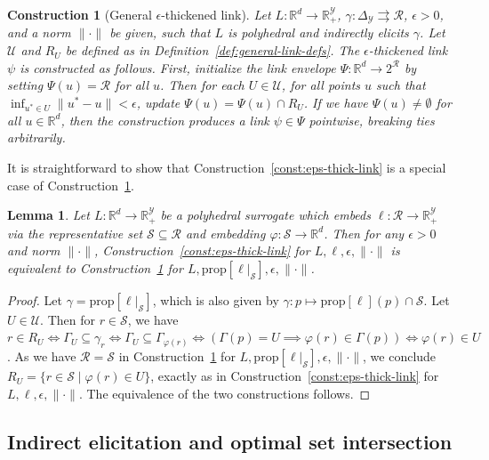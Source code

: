 \documentclass[11pt]{article}
\newcommand{\reals}{\mathbb{R}}
\newcommand{\prop}[1]{\mathrm{prop}[#1]}
\newcommand{\simplex}{\Delta_\Y}
\newcommand{\R}{\mathcal{R}}
\newcommand{\Sc}{\mathcal{S}}
\newcommand{\U}{\mathcal{U}}
\newcommand{\Y}{\mathcal{Y}}
\newcommand{\toto}{\rightrightarrows}
\newtheorem{lemma}{Lemma}
\newtheorem{construction}{Construction}
\begin{document}
\begin{construction}[General $\epsilon$-thickened link] \label{const:general-eps-thick-link}
  Let $L:\reals^d\to\reals^\Y_+$, $\gamma:\simplex\toto\R$, $\epsilon > 0$, and a norm $\|\cdot\|$ be given, such that $L$ is polyhedral and indirectly elicits $\gamma$.
  Let $\U$ and $R_U$ be defined as in Definition~\ref{def:general-link-defs}.
  The \emph{$\epsilon$-thickened link} $\psi$ is constructed as follows.
  First, initialize the \emph{link envelope} $\Psi: \reals^d \to 2^{\R}$ by setting $\Psi(u) = \R$ for all $u$.
  Then for each $U \in \U$, for all points $u$ such that $\inf_{u^* \in U} \|u^*-u\| < \epsilon$, update $\Psi(u) = \Psi(u) \cap R_U$.
  If we have $\Psi(u)\neq\emptyset$ for all $u\in\reals^d$, then the construction \emph{produces a link} $\psi \in \Psi$ pointwise, breaking ties arbitrarily.
\end{construction}

It is straightforward to show that Construction~\ref{const:eps-thick-link} is a special case of Construction~\ref{const:general-eps-thick-link}.

\begin{lemma}\label{lem:general-construction-special-case}
  Let $L:\reals^d\to\reals^\Y_+$ be a polyhedral surrogate which embeds $\ell:\R\to\reals^\Y_+$ via the representative set $\Sc\subseteq\R$ and embedding $\varphi:\Sc\to\reals^d$.
  Then for any $\epsilon>0$ and norm $\|\cdot\|$,
  Construction~\ref{const:eps-thick-link} for $L,\ell,\epsilon,\|\cdot\|$ is equivalent to
  Construction~\ref{const:general-eps-thick-link} for $L,\prop{\ell|_\Sc},\epsilon,\|\cdot\|$.
\end{lemma}
\begin{proof}
  Let $\gamma = \prop{\ell|_\Sc}$, which is also given by $\gamma: p \mapsto \prop{\ell}(p) \cap \Sc$.
  Let $U\in\U$.
  Then for $r\in\Sc$, we have $r \in R_U \iff \Gamma_U \subseteq \gamma_r \iff \Gamma_U \subseteq \Gamma_{\varphi(r)} \iff (\Gamma(p) = U \implies \varphi(r) \in \Gamma(p)) \iff \varphi(r) \in U$.
  As we have $\R = \Sc$ in Construction~\ref{const:general-eps-thick-link} for $L,\prop{\ell|_\Sc},\epsilon,\|\cdot\|$, we conclude
  $R_U = \{r\in\Sc \mid \varphi(r) \in U\}$, exactly as in Construction~\ref{const:eps-thick-link} for $L,\ell,\epsilon,\|\cdot\|$.
  The equivalence of the two constructions follows.
\end{proof}

\subsection{Indirect elicitation and optimal set intersection}
\end{document}
